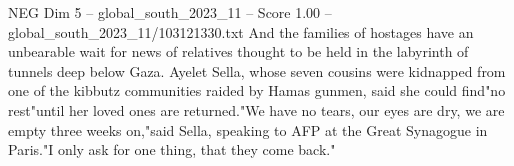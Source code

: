 \begin{textsample}{NEG Dim 5 – global\_south\_2023\_11 – Score 1.00 – global\_south\_2023\_11/103121330.txt}
And the families of hostages have an unbearable wait for news of relatives thought to be held in the labyrinth of tunnels deep below Gaza.
Ayelet Sella, whose seven cousins were kidnapped from one of the kibbutz communities raided by Hamas gunmen, said she could find"no rest"until her loved ones are returned."We have no tears, our eyes are dry, we are empty three weeks on,"said Sella, speaking to AFP at the Great Synagogue in Paris."I only ask for one thing, that they come back."

\end{textsample}
